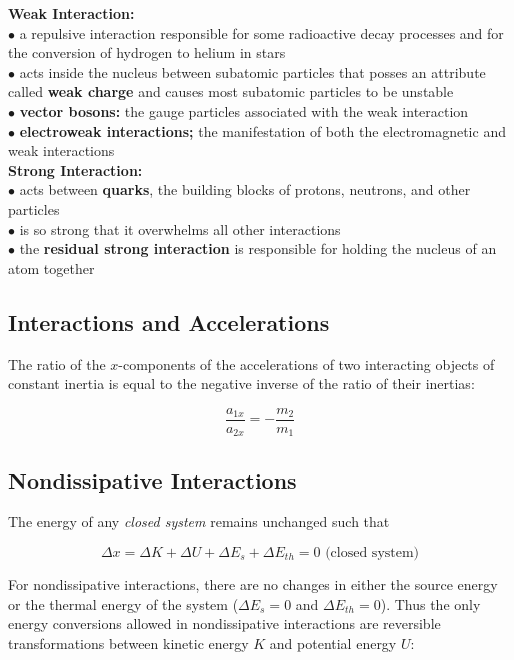         \textbf{Weak Interaction:} \\
        $\bullet$ a repulsive interaction responsible for some radioactive decay processes and for the conversion of hydrogen to helium in stars \\
        $\bullet$ acts inside the nucleus between subatomic particles that posses an attribute called \textbf{weak charge} and causes most subatomic particles to be unstable \\
        $\bullet$ \textbf{vector bosons:} the gauge particles associated with the weak interaction \\
        $\bullet$ \textbf{electroweak interactions;} the manifestation of both the electromagnetic and weak interactions \\

        \textbf{Strong Interaction:} \\
        $\bullet$ acts between \textbf{quarks}, the building blocks of protons, neutrons, and other particles \\
        $\bullet$ is so strong that it overwhelms all other interactions \\
        $\bullet$ the \textbf{residual strong interaction} is responsible for holding the nucleus of an atom together

    \pagebreak
    \subsection{Interactions and Accelerations}

        The ratio of the $x$-components of the accelerations of two interacting objects of constant inertia is equal to the negative inverse of the ratio of their inertias:

        \[
            \frac{a_{1x}}{a_{2x}} = - \frac{m_2}{m_1}
        \]



    \subsection{Nondissipative Interactions}

        The energy of any \textit{closed system} remains unchanged such that

        \[
            \Delta x = \Delta K + \Delta U + \Delta E_s + \Delta E_{th} = 0 \text{ (closed system)}
        \]

        For nondissipative interactions, there are no changes in either the source energy or the thermal energy of the system ($\Delta E_s=0$ and $\Delta E_{th}=0$). Thus the only energy conversions allowed in
        nondissipative interactions are reversible transformations between kinetic energy $K$ and potential energy $U$:

